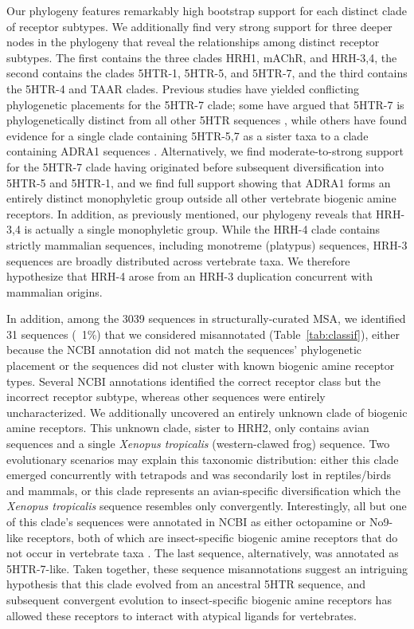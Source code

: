 \documentclass[fleqn,10pt]{wlpeerj}
\begin{document}
Our phylogeny features remarkably high bootstrap support for each distinct clade of receptor subtypes. We additionally find very strong support for three deeper nodes in the phylogeny that reveal the relationships among distinct receptor subtypes. The first contains the three clades HRH1, mAChR, and HRH-3,4, the second contains the clades 5HTR-1, 5HTR-5, and 5HTR-7, and the third contains the 5HTR-4 and TAAR clades. Previous studies have yielded conflicting phylogenetic placements for the 5HTR-7 clade; some have argued that 5HTR-7 is phylogenetically distinct from all other 5HTR sequences \citep{KakaralaJamil2014}, while others have found evidence for a single clade containing 5HTR-5,7 as a sister taxa to a clade containing ADRA1 sequences \citep{Fredrikssonetal2003}. Alternatively, we find moderate-to-strong support for the 5HTR-7 clade having originated before subsequent diversification into 5HTR-5 and 5HTR-1, and we find full support showing that ADRA1 forms an entirely distinct monophyletic group outside all other vertebrate biogenic amine receptors. In addition, as previously mentioned, our phylogeny reveals that HRH-3,4 is actually a single monophyletic group. While the HRH-4 clade contains strictly mammalian sequences, including monotreme (platypus) sequences, HRH-3 sequences are broadly distributed across vertebrate taxa. We therefore hypothesize that HRH-4 arose from an HRH-3 duplication concurrent with mammalian origins.

In addition, among the 3039 sequences in structurally-curated MSA, we identified 31 sequences (~1\%) that we considered misannotated (Table~\ref{tab:classif}), either because the NCBI annotation did not match the sequences' phylogenetic placement or the sequences did not cluster with known biogenic amine receptor types. Several NCBI annotations identified the correct receptor class but the incorrect receptor subtype, whereas other sequences were entirely uncharacterized. We additionally uncovered an entirely unknown clade of biogenic amine receptors. This unknown clade, sister to HRH2, only contains avian sequences and a single \emph{Xenopus tropicalis} (western-clawed frog) sequence. Two evolutionary scenarios may explain this taxonomic distribution: either this clade emerged concurrently with tetrapods and was secondarily lost in reptiles/birds and mammals, or this clade represents an avian-specific diversification which the \emph{Xenopus tropicalis} sequence resembles only convergently. Interestingly, all but one of this clade's sequences were annotated in NCBI as either octopamine or No9-like receptors, both of which are insect-specific biogenic amine receptors that do not occur in vertebrate taxa \citep{Roeder2005}. The last sequence, alternatively, was annotated as 5HTR-7-like. Taken together, these sequence misannotations suggest an intriguing hypothesis that this clade evolved from an ancestral 5HTR sequence, and subsequent convergent evolution to insect-specific biogenic amine receptors has allowed these receptors to interact with atypical ligands for vertebrates.
\end{document}
